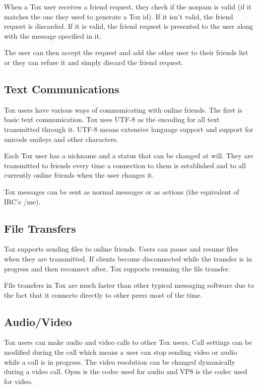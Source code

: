 \documentclass{tox}
\begin{document}
When a Tox user receives a friend request, they check if the nospam is valid (if 
it matches the one they used to generate a Tox id). If it isn't valid, the friend 
request is discarded. If it is valid, the friend request is presented to the 
user along with the message specified in it.

The user can then accept the request and add the other user to their friends list 
or they can refuse it and simply discard the friend request.

\subsection{Text Communications}

Tox users have various ways of communicating with online friends. The first is 
basic text communication. Tox uses UTF-8 as the encoding for all text 
transmitted through it. UTF-8 means extensive language support and support for 
unicode smileys and other characters.

Each Tox user has a nickname and a status that can be changed at will. They are 
transmitted to friends every time a connection to them is established and to 
all currently online friends when the user changes it.

Tox messages can be sent as normal messages or as actions (the equivalent of 
IRC's /me).

\subsection{File Transfers}

Tox supports sending files to online friends. Users can pause and resume files 
when they are transmitted. If clients become disconnected while the transfer is 
in progress and then reconnect after, Tox supports resuming the file transfer.

File transfers in Tox are much faster than other typical messaging software due 
to the fact that it connects directly to other peers most of the time.

\subsection{Audio/Video}

Tox users can make audio and video calls to other Tox users. Call settings can 
be modified during the call which means a user can stop sending video or audio 
while a call is in progress. The video resolution can be changed dynamically 
during a video call. Opus is the codec used for audio and VP8 is the codec used 
for video.
\end{document}
